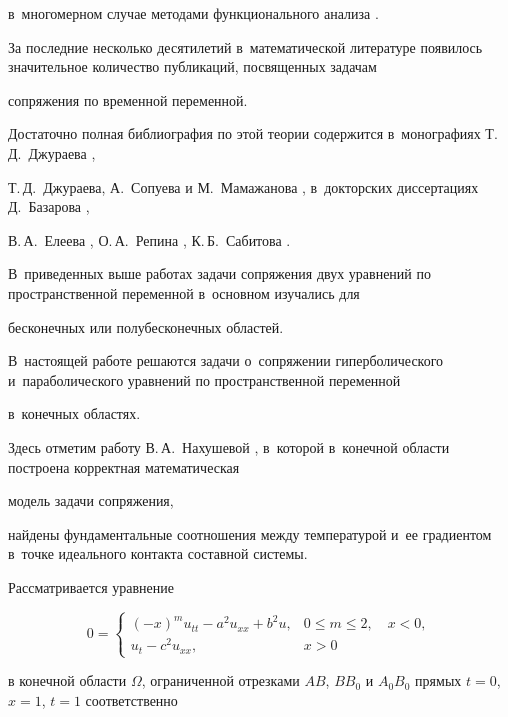 в~многомерном случае методами функционального анализа \cite{eleevbalk:bib:Kor}.



За последние несколько десятилетий в~математической литературе появилось значительное количество публикаций, посвященных задачам

сопряжения по временной переменной.

Достаточно полная библиография по этой теории содержится в~монографиях Т.\,Д.~Джураева \cite{eleevbalk:bib:Jur},

Т.\,Д.~Джураева, А.~Сопуева и М.~Мамажанова \cite{eleevbalk:bib:JurSop}, в~докторских диссертациях Д.~Базарова \cite{eleevbalk:bib:Baz},

В.\,А.~Елеева \cite{eleevbalk:bib:El}, О.\,А.~Репина \cite{eleevbalk:bib:Rep}, К.\,Б.~Сабитова \cite{eleevbalk:bib:Sab}.

В~приведенных выше работах задачи сопряжения двух уравнений по пространственной переменной в~основном изучались для

бесконечных или полубесконечных областей.



В~настоящей работе решаются задачи о~сопряжении гиперболического и~параболического уравнений по пространственной переменной

в~конечных областях.

Здесь отметим работу В.\,А.~Нахушевой \cite{eleevbalk:bib:Nah}, в~которой в~конечной области построена корректная математическая

модель задачи сопряжения,

найдены фундаментальные соотношения между температурой и~ее градиентом в~точке идеального контакта составной системы.



Рассматривается уравнение

\begin{equation} \label{el:1}

{0} = 

\begin{cases}

(-x)^m u_{tt}-a^2u_{xx}+b^2u, & 0 \leq m\leq2, \quad x<0, \\

u_{t}-c^2u_{xx}, & x>0

\end{cases}

\end{equation}

в конечной области $\Omega$, ограниченной отрезками $AB$, $BB_{0}$ и $A_{0}B_{0}$ прямых \linebreak $t=0$, $x=1$, $t=1$ соответственно


